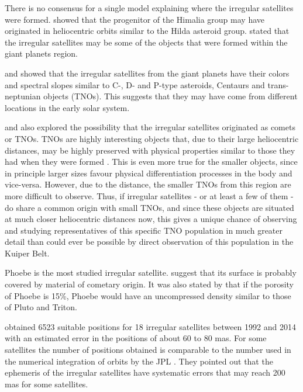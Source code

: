 \documentclass[useAMS,usenatbib]{mn2e}
\begin{document}
There is no consensus for a single model explaining where the irregular satellites were formed. \cite{Cuk2004} showed that the progenitor of the Himalia group may have originated in heliocentric orbits similar to the Hilda asteroid group. \cite{Sheppard2005} stated that the irregular satellites may be some of the objects that were formed within the giant planets region.

\cite{Grav2003} and \cite{Grav2007} showed that the irregular satellites from the giant planets have their colors and spectral slopes similar to C-, D- and P-type asteroids, Centaurs and trans-neptunian objects (TNOs). This suggests that they may have come from different locations in the early solar system.

\cite{Sheppard2005} and \cite{Jewitt2007} also explored the possibility that the irregular satellites originated as comets or TNOs. TNOs are highly interesting objects that, due to their large heliocentric distances, may be highly preserved with physical properties similar to those they had when they were formed \citep{Barucci2008}. This is even more true for the smaller objects, since in principle larger sizes favour physical differentiation processes in the body and vice-versa. However, due to the distance, the smaller TNOs from this region are more difficult to observe. Thus, if irregular satellites - or at least a few of them - do share a common origin with small TNOs, and since these objects are situated at much closer heliocentric distances now, this gives a unique chance of observing and studying representatives of this specific TNO population in much greater detail than could ever be possible by direct observation of this population in the Kuiper Belt. 

Phoebe is the most studied irregular satellite. \cite{Clark2005} suggest that its surface is probably covered by material of cometary origin. It was also stated by \cite{Johnson2005} that if the porosity of Phoebe is 15\%, Phoebe would have an uncompressed density similar to those of Pluto and Triton.

\cite{GomesJunior2015} obtained 6523 suitable positions for 18 irregular satellites between 1992 and 2014 with an estimated error in the positions of about 60 to 80 mas. For some satellites the number of positions obtained is comparable to the number used in the numerical integration of orbits by the JPL \citep{Jacobson2012}. They pointed out that the ephemeris of the irregular satellites have systematic errors that may reach 200 mas for some satellites.
\end{document}
